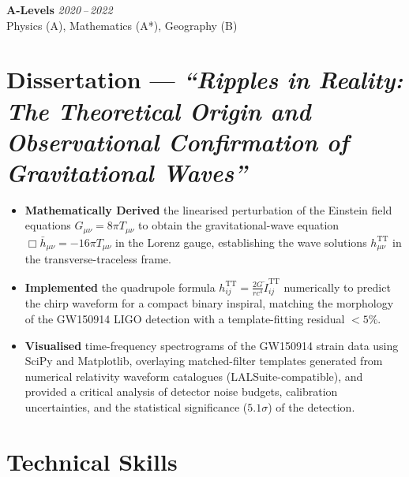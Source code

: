\documentclass[10pt, a4paper]{article}
\begin{document}
\vspace{4pt}
\textbf{A-Levels} \hfill \textit{2020\,--\,2022}\\
Physics (A), Mathematics (A*), Geography (B)

\section{Dissertation --- \textit{``Ripples in Reality: The Theoretical Origin and\\
Observational Confirmation of Gravitational Waves''}}

\begin{itemize}
  \item \textbf{Mathematically Derived} the linearised perturbation of the Einstein field equations
        $G_{\mu\nu}=8\pi T_{\mu\nu}$ to obtain the gravitational-wave equation
        $\Box\bar{h}_{\mu\nu}=-16\pi T_{\mu\nu}$ in the Lorenz gauge, establishing the wave solutions
        $h_{\mu\nu}^{\mathrm{TT}}$ in the transverse-traceless frame.
  \item \textbf{Implemented} the quadrupole formula
        $h_{ij}^{\mathrm{TT}}=\tfrac{2G}{rc^4}\ddot{I}_{ij}^{\mathrm{TT}}$
        numerically to predict the chirp waveform for a compact binary inspiral,
        matching the morphology of the GW150914 LIGO detection with a
        template-fitting residual $<5\%$.
  \item \textbf{Visualised} time-frequency spectrograms of the GW150914 strain data using SciPy
        and Matplotlib, overlaying matched-filter templates generated from numerical relativity
        waveform catalogues (LALSuite-compatible), and provided a critical analysis of detector
        noise budgets, calibration uncertainties, and the statistical significance ($5.1\sigma$) of
        the detection.
\end{itemize}

\section{Technical Skills}
\end{document}
